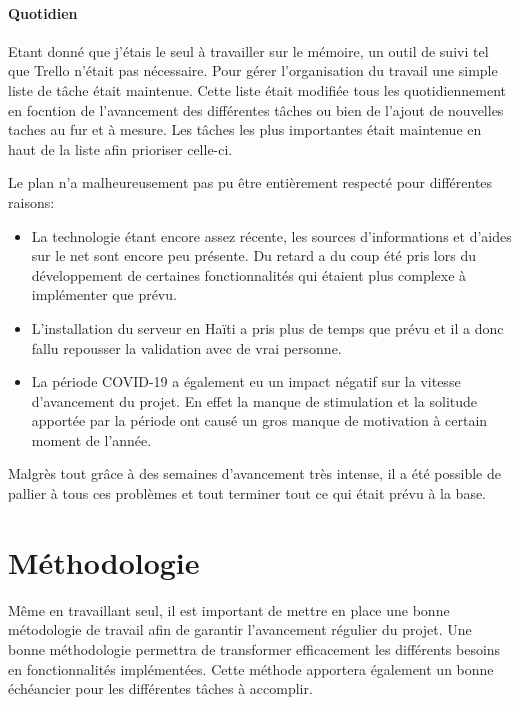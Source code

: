 \documentclass{EPL-master-thesis-covers-FR}
\begin{document}
				\paragraph*{Quotidien}
				Etant donné que j'étais le seul à travailler sur le mémoire, un outil de suivi tel que Trello n'était pas nécessaire. Pour gérer l'organisation du travail une simple liste de tâche était maintenue. Cette liste était modifiée tous les quotidiennement en focntion de l'avancement des différentes tâches ou bien de l'ajout de nouvelles taches au fur et à mesure. Les tâches les plus importantes était maintenue en haut de la liste afin prioriser celle-ci. 
				
				Le plan n'a malheureusement pas pu être entièrement respecté pour différentes raisons:
				\begin{itemize}
					\item La technologie étant encore assez récente, les sources d'informations et d'aides sur le net sont encore peu présente. Du retard a du coup été pris lors du développement de certaines fonctionnalités qui étaient plus complexe à implémenter que prévu.
					\item L'installation du serveur en Haïti a pris plus de temps que prévu et il a donc fallu repousser la validation avec de vrai personne. 
					\item La période COVID-19 a également eu un impact négatif sur la vitesse d'avancement du projet. En effet la manque de stimulation et la solitude apportée par la période ont causé un gros manque de motivation à certain moment de l'année.
				\end{itemize}				
				
				Malgrès tout grâce à des semaines d'avancement très intense, il a été possible de pallier à tous ces problèmes et tout terminer tout ce qui était prévu à la base.
				

		\section{Méthodologie}
			Même en travaillant seul, il est important de mettre en place une bonne métodologie de travail afin de garantir l'avancement régulier du projet. Une bonne méthodologie permettra de transformer efficacement les différents besoins en fonctionnalités implémentées. Cette méthode apportera également un bonne échéancier pour les différentes tâches à accomplir.
\end{document}
